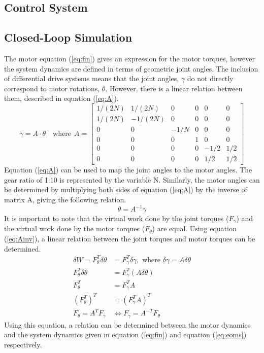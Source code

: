 \newpage
\subsection{Control System}
\newpage
\subsection{Closed-Loop Simulation}
The motor equation (\ref{eq:fin}) gives an expression for the motor torques, however the system dynamics are defined in terms of geometric joint angles. The inclusion of differential drive systems means that the joint angles, $\gamma$ do not directly correspond to motor rotations, $\theta$. However, there is a linear relation between them, described in equation (\ref{eq:A}).
\begin{equation}
  \gamma = A\cdot\theta\quad \text{where}~~A=\left[\begin{array}{cccccc}{1 /(2 N)} & {1 /(2 N)} & {0} & {0} & {0} & {0} \\ {1 /(2 N)} & {-1 /(2 N)} & {0} & {0} & {0} & {0} \\ {0} & {0} & {-1 / N} & {0} & {0} & {0} \\ {0} & {0} & {0} & {1} & {0} & {0} \\ {0} & {0} & {0} & {0} & {-1 / 2} & {1 / 2} \\ {0} & {0} & {0} & {0} & {1 / 2} & {1 / 2}\end{array}\right]
\label{eq:A}
\end{equation}
Equation (\ref{eq:A}) can be used to map the joint angles to the motor angles. The gear ratio of 1:10 is represented by the variable N. Similarly, the motor angles can be determined by multiplying both sides of equation (\ref{eq:A}) by the inverse of matrix A, giving the following relation.
\begin{equation}
\theta=A^{-1} \gamma
\label{eq:Ainv}
\end{equation}
It is important to note that the virtual work done by the joint torques ($F_{\gamma}$) and the virtual work done by the motor torques ($F_{\theta}$) are equal. Using equation (\ref{eq:Ainv}), a linear relation between the joint torques and motor torques can be determined.
\[
\begin{aligned}
  \delta W = F_{\theta}^{T} \delta \theta&=F_{\gamma}^{T} \delta \gamma, \text { where } \delta \gamma=A \delta \theta \\
  F_{\theta}^{T} \delta \theta &= F_{\gamma}^{T}(A \delta \theta) \\
  F_{\theta}^{T}&=F_{\gamma}^{T} A\\
  \left(F_{\theta}^{T}\right)^{T}&=\left(F_{\gamma}^{T} A\right)^{T}\\
  F_{\theta}=A^{T} F_{\gamma} &\Leftrightarrow F_{\gamma}=A^{-T} F_{\theta}\qquad\quad
\end{aligned}
\]
Using this equation, a relation can be determined between the motor dynamics and the system dynamics given in equation (\ref{eq:fin}) and equation (\ref{eq:eoms}) respectively.

